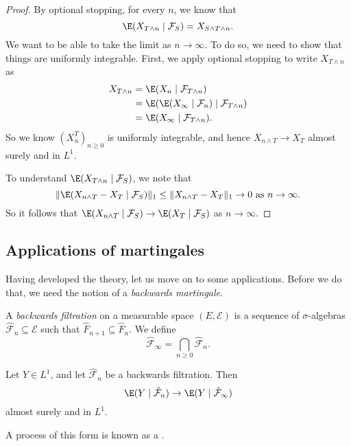 \documentclass[a4paper]{article}
\begin{document}
\begin{proof}
  By optional stopping, for every $n$, we know that
  \[
    \E (X_{T \wedge n} \mid \mathcal{F}_S) = X_{S \wedge T \wedge n}.
  \]
  We want to be able to take the limit as $n \to \infty$. To do so, we need to show that things are uniformly integrable. First, we apply optional stopping to write $X_{T \wedge n}$ as
  \begin{align*}
    X_{T\wedge n} &= \E(X_n \mid \mathcal{F}_{T \wedge n})\\
    &= \E(\E(X_\infty \mid \mathcal{F}_n) \mid \mathcal{F}_{T \wedge n})\\
    &= \E(X_\infty \mid \mathcal{F}_{T \wedge n}).
  \end{align*}
  So we know $(X_n^T)_{n \geq 0}$ is uniformly integrable, and hence $X_{n \wedge T} \to X_T$ almost surely and in $L^1$.

  To understand $\E (X_{T \wedge n} \mid \mathcal{F}_S)$, we note that
  \[
    \|\E(X_{n \wedge T} - X_T \mid \mathcal{F}_S)\|_1 \leq \|X_{n \wedge T} - X_T \|_1 \to 0\text{ as }n \to \infty.
  \]
  So it follows that $\E(X_{n \wedge T} \mid \mathcal{F}_S) \to \E(X_T \mid \mathcal{F}_S)$ as $n \to \infty$.
\end{proof}

\subsection{Applications of martingales}
Having developed the theory, let us move on to some applications. Before we do that, we need the notion of a \emph{backwards martingale}.
\begin{defi}
  A \emph{backwards filtration} on a measurable space $(E, \mathcal{E})$ is a sequence of $\sigma$-algebras $\hat{\mathcal{F}}_n \subseteq \mathcal{E}$ such that $\hat{F}_{n + 1} \subseteq \hat{F}_n$. We define
  \[
    \hat{\mathcal{F}}_\infty = \bigcap_{n \geq 0} \hat{\mathcal{F}}_n.
  \]
\end{defi}

\begin{thm}
  Let $Y \in L^1$, and let $\hat{\mathcal{F}}_n$ be a backwards filtration. Then
  \[
    \E(Y \mid \hat{\mathcal{F}}_n) \to \E(Y \mid \hat{\mathcal{F}}_\infty)
  \]
  almost surely and in $L^1$.
\end{thm}
A process of this form is known as a .
\end{document}
